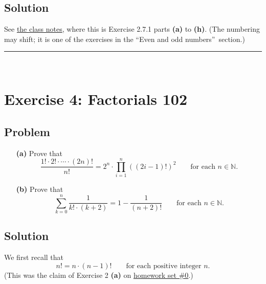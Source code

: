\documentclass[paper=a4, fontsize=12pt]{scrartcl}%
\let\sumnonlimits\sum
\let\prodnonlimits\prod
\renewcommand{\sum}{\sumnonlimits\limits}
\renewcommand{\prod}{\prodnonlimits\limits}
\theoremstyle{plainsl}
\theoremstyle{definition}
\theoremstyle{remark}
\begin{document}
\subsection{Solution}

See \href{http://www.cip.ifi.lmu.de/~grinberg/t/19s/notes.pdf}{the class
notes}, where this is Exercise 2.7.1 parts \textbf{(a)} to \textbf{(h)}. (The
numbering may shift; it is one of the exercises in the \textquotedblleft Even
and odd numbers\textquotedblright\ section.)

\rule{\linewidth}{0.3pt} \\[0.4cm]

\section{Exercise 4: Factorials 102}

\subsection{Problem}

\begin{enumerate}
\item[\textbf{(a)}] Prove that
\[
\dfrac{1! \cdot2! \cdot\cdots\cdot\left(  2n \right)  !}{n!} = 2^{n}
\cdot\prod_{i=1}^{n} \left(  \left(  2i-1 \right)  ! \right)  ^{2}
\qquad\text{for each } n \in\mathbb{N} .
\]


\item[\textbf{(b)}] Prove that
\[
\sum_{k=0}^{n} \dfrac{1}{k! \cdot\left(  k+2 \right)  } = 1 - \dfrac
{1}{\left(  n+2 \right)  !} \qquad\text{for each } n \in\mathbb{N} .
\]

\end{enumerate}

\subsection{Solution}

We first recall that%
\begin{equation}
n!=n\cdot\left(  n-1\right)  !\qquad\text{for each positive integer }n.
\label{sol.factorials.102.fac-rec}%
\end{equation}
(This was the claim of Exercise 2 \textbf{(a)} on
\href{http://www.cip.ifi.lmu.de/~grinberg/t/19s/hw0s.pdf}{homework set \#0}.)
\end{document}
